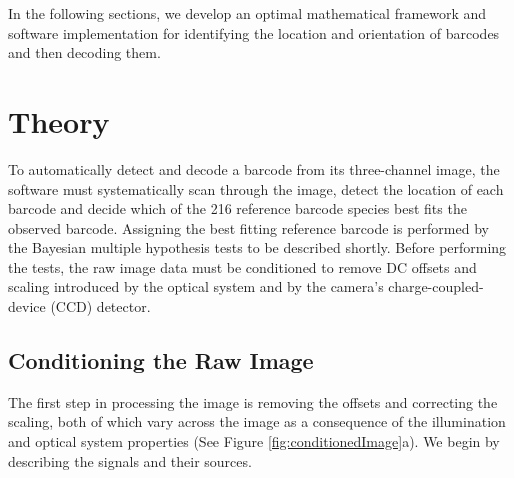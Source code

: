 In the following sections, we develop an optimal mathematical framework and software implementation for identifying the location and orientation of barcodes and then decoding them.


\section{Theory}
To automatically detect and decode a barcode from its three-channel image, the software must systematically scan through the image, detect the location of each barcode and decide which of the 216 reference barcode species best fits the observed barcode. Assigning the best fitting reference barcode is performed by the Bayesian multiple hypothesis tests to be described shortly. Before performing the tests, the raw image data must be conditioned to remove DC offsets and scaling introduced by the optical system and by the camera's charge-coupled-device (CCD) detector.


\subsection{Conditioning the Raw Image}
The first step in processing the image is removing the offsets and correcting the scaling, both of which vary across the image as a consequence of the illumination and optical system properties (See Figure \ref{fig:conditionedImage}a). We begin by describing the signals and their sources.

